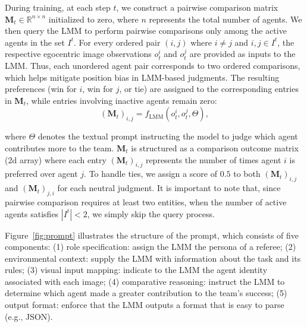 \documentclass[11pt]{article}
\begin{document}
%
During training, at each step $t$, we construct a pairwise comparison matrix $\boldsymbol{M}_t \in \mathbb{R}^{n \times n}$ initialized to zero, where $n$ represents the total number of agents. We then query the LMM to perform pairwise comparisons only among the active agents in the set $I^t$. For every ordered pair $(i,j)$ where $i \neq j$ and $i, j \in I^t$, the respective egocentric image observations $o_t^i$ and $o_t^j$ are provided as inputs to the LMM. Thus, each unordered agent pair corresponds to two ordered comparisons, which helps mitigate position bias \cite{tian2025identifying} in LMM-based judgments. The resulting preferences (win for $i$, win for $j$, or tie) are assigned to the corresponding entries in $\boldsymbol{M}_t$, while entries involving inactive agents remain zero:
\begin{equation}
    (\boldsymbol{M}_t)_{i,j} = f_{\text{LMM}}(o_t^i, o_t^j, \Theta),
\end{equation}

\noindent where $\Theta$ denotes the textual prompt instructing the model to judge which agent contributes more to the team. $\boldsymbol{M}_t$ is structured as a comparison outcome matrix (2d array) where each entry $(\boldsymbol{M}_t)_{i,j}$ represents the number of times agent $i$ is preferred over agent $j$. To handle ties, we assign a score of $0.5$ to both $(\boldsymbol{M}_t)_{i,j}$ and $(\boldsymbol{M}_t)_{j,i}$ for each neutral judgment. It is important to note that, since pairwise comparison requires at least two entities, when the number of active agents satisfies \( |I^{t}| < 2 \), we simply skip the query process.


Figure~\ref{fig:prompt} illustrates the structure of the prompt, which consists of five components: (1) role specification: assign the LMM the persona of a referee; (2) environmental context: supply the LMM with information about the task and its rules; (3) visual input mapping: indicate to the LMM the agent identity associated with each image; (4) comparative reasoning: instruct the LMM to determine which agent made a greater contribution to the team's success; (5) output format: enforce that the LMM outputs a format that is easy to parse (e.g., JSON).
\end{document}
